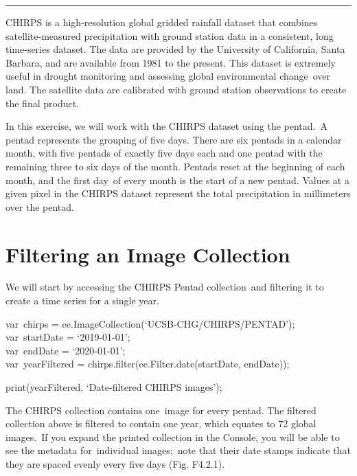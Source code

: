 \documentclass[
  letterpaper,
  DIV=11,
  numbers=noendperiod]{scrreprt}
\begin{document}

\begin{center}\rule{0.5\linewidth}{0.5pt}\end{center}

CHIRPS is a high-resolution global gridded rainfall dataset that
combines satellite-measured precipitation with ground station data in a
consistent, long time-series dataset. The data are provided by the
University of California, Santa Barbara, and are available from 1981 to
the present. This dataset is extremely useful in drought monitoring and
assessing global environmental change~over land. The satellite data are
calibrated with ground station observations to create the final product.

In this exercise, we will work with the CHIRPS dataset using the
pentad.~A pentad represents the grouping of five days. There are six
pentads in a calendar month, with five pentads of exactly five days each
and one pentad with the remaining three to six days of the month.
Pentads reset at the beginning of each month, and the first day~of every
month is the start of a new pentad. Values at a given pixel in the
CHIRPS dataset represent the total precipitation in millimeters over the
pentad.

\hypertarget{filtering-an-image-collection}{%
\section{Filtering an Image
Collection}\label{filtering-an-image-collection}}

We will start by accessing the CHIRPS Pentad collection~and filtering it
to create a time series for a single year.

var~chirps = ee.ImageCollection(`UCSB-CHG/CHIRPS/PENTAD');\\
var~startDate = `2019-01-01';\\
var~endDate = `2020-01-01';\\
var~yearFiltered = chirps.filter(ee.Filter.date(startDate, endDate));

print(yearFiltered, `Date-filtered CHIRPS images');

The CHIRPS collection contains one~image for every pentad. The filtered
collection above is filtered to contain one year, which equates to 72
global images.~If you expand the printed collection in the Console, you
will be able to see the metadata for~individual images;~note that their
date stamps indicate that they are spaced evenly every five days (Fig.
F4.2.1).
\end{document}
